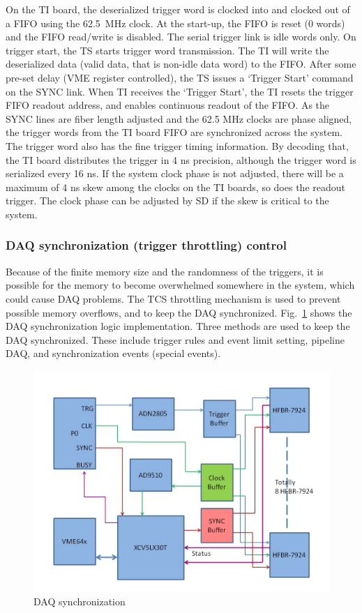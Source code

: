 On the TI board, the deserialized trigger word is clocked into and clocked out of a FIFO using the 62.5~MHz clock.  At the start-up, the FIFO is reset (0 words) and the FIFO read/write is disabled.  The serial trigger link is idle words only.  On trigger start, the TS starts trigger word transmission.  The TI will write the deserialized data (valid data, that is non-idle data word) to the FIFO.  After some pre-set delay (VME register controlled), the TS issues a ‘Trigger Start’ command on the SYNC link.  When TI receives the ‘Trigger Start’, the TI resets the trigger FIFO readout address, and enables continuous readout of the FIFO.  As the SYNC lines are fiber length adjusted and the 62.5 MHz clocks are phase aligned, the trigger words from the TI board FIFO are synchronized across the system.
The trigger word also has the fine trigger timing information.  By decoding that, the TI board distributes the trigger in 4 ns precision, although the trigger word is serialized every 16 ns.  If the system clock phase is not adjusted, there will be a maximum of 4 ns skew among the clocks on the TI boards, so does the readout trigger.  The clock phase can be adjusted by SD if the skew is critical to the system.


\subsubsection{DAQ synchronization (trigger throttling) control}

Because of the finite memory size and the randomness of the triggers, it is possible for the memory to become overwhelmed somewhere in the system, which could cause DAQ problems.   The TCS throttling mechanism is used to prevent possible memory overflows, and to keep the DAQ synchronized.  Fig.~\ref{fig:DAQ_synchronization} shows the DAQ synchronization logic implementation.  Three methods are used to keep the DAQ synchronized.  These include trigger rules and event limit setting, pipeline DAQ, and synchronization events (special events).

\begin{figure}[hbt]
	\centering
	\includegraphics[width=1.0\columnwidth,keepaspectratio]{img/TDdiagram.jpg}
	\caption{DAQ synchronization}
	\label{fig:DAQ_synchronization}
\end{figure}


